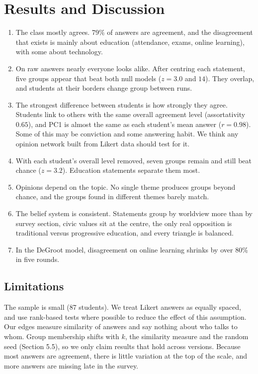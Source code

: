 \documentclass[10pt,a4paper]{article}
\newcounter{tech}\renewcommand{\thetech}{A\arabic{tech}}
\begin{document}
\section{Results and Discussion}
\begin{enumerate}
  \item The class mostly agrees. 79\% of answers are agreement, and the disagreement that exists is mainly about education (attendance, exams, online learning), with some about technology.
  \item On raw answers nearly everyone looks alike. After centring each statement, five groups appear that beat both null models ($z=3.0$ and $14$). They overlap, and students at their borders change group between runs.
  \item The strongest difference between students is how strongly they agree. Students link to others with the same overall agreement level (assortativity $0.65$), and PC1 is almost the same as each student's mean answer ($r=0.98$). Some of this may be conviction and some answering habit. We think any opinion network built from Likert data should test for it.
  \item With each student's overall level removed, seven groups remain and still beat chance ($z=3.2$). Education statements separate them most.
  \item Opinions depend on the topic. No single theme produces groups beyond chance, and the groups found in different themes barely match.
  \item The belief system is consistent. Statements group by worldview more than by survey section, civic values sit at the centre, the only real opposition is traditional versus progressive education, and every triangle is balanced.
  \item In the DeGroot model, disagreement on online learning shrinks by over 80\% in five rounds.
\end{enumerate}
\subsection*{Limitations}
The sample is small (87 students). We treat Likert answers as equally spaced, and use rank-based tests where possible to reduce the effect of this assumption. Our edges measure similarity of answers and say nothing about who talks to whom. Group membership shifts with $k$, the similarity measure and the random seed (Section 5.5), so we only claim results that hold across versions. Because most answers are agreement, there is little variation at the top of the scale, and more answers are missing late in the survey.
\end{document}
